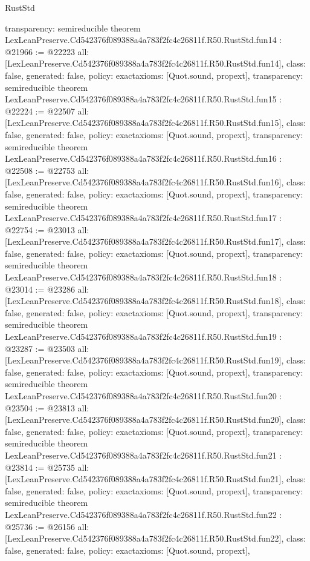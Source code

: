 \begin{lexlean}{RustStd}
\begin{coremodule}
{  transparency: semireducible
}
theorem LexLeanPreserve.Cd542376f089388a4a783f2fc4c26811f.R50.RustStd.fun14 : @21966 := @22223 {
  all: [LexLeanPreserve.Cd542376f089388a4a783f2fc4c26811f.R50.RustStd.fun14],
  class: false,
  generated: false,
  policy: exact{axioms: [Quot.sound, propext]},
  transparency: semireducible
}
theorem LexLeanPreserve.Cd542376f089388a4a783f2fc4c26811f.R50.RustStd.fun15 : @22224 := @22507 {
  all: [LexLeanPreserve.Cd542376f089388a4a783f2fc4c26811f.R50.RustStd.fun15],
  class: false,
  generated: false,
  policy: exact{axioms: [Quot.sound, propext]},
  transparency: semireducible
}
theorem LexLeanPreserve.Cd542376f089388a4a783f2fc4c26811f.R50.RustStd.fun16 : @22508 := @22753 {
  all: [LexLeanPreserve.Cd542376f089388a4a783f2fc4c26811f.R50.RustStd.fun16],
  class: false,
  generated: false,
  policy: exact{axioms: [Quot.sound, propext]},
  transparency: semireducible
}
theorem LexLeanPreserve.Cd542376f089388a4a783f2fc4c26811f.R50.RustStd.fun17 : @22754 := @23013 {
  all: [LexLeanPreserve.Cd542376f089388a4a783f2fc4c26811f.R50.RustStd.fun17],
  class: false,
  generated: false,
  policy: exact{axioms: [Quot.sound, propext]},
  transparency: semireducible
}
theorem LexLeanPreserve.Cd542376f089388a4a783f2fc4c26811f.R50.RustStd.fun18 : @23014 := @23286 {
  all: [LexLeanPreserve.Cd542376f089388a4a783f2fc4c26811f.R50.RustStd.fun18],
  class: false,
  generated: false,
  policy: exact{axioms: [Quot.sound, propext]},
  transparency: semireducible
}
theorem LexLeanPreserve.Cd542376f089388a4a783f2fc4c26811f.R50.RustStd.fun19 : @23287 := @23503 {
  all: [LexLeanPreserve.Cd542376f089388a4a783f2fc4c26811f.R50.RustStd.fun19],
  class: false,
  generated: false,
  policy: exact{axioms: [Quot.sound, propext]},
  transparency: semireducible
}
theorem LexLeanPreserve.Cd542376f089388a4a783f2fc4c26811f.R50.RustStd.fun20 : @23504 := @23813 {
  all: [LexLeanPreserve.Cd542376f089388a4a783f2fc4c26811f.R50.RustStd.fun20],
  class: false,
  generated: false,
  policy: exact{axioms: [Quot.sound, propext]},
  transparency: semireducible
}
theorem LexLeanPreserve.Cd542376f089388a4a783f2fc4c26811f.R50.RustStd.fun21 : @23814 := @25735 {
  all: [LexLeanPreserve.Cd542376f089388a4a783f2fc4c26811f.R50.RustStd.fun21],
  class: false,
  generated: false,
  policy: exact{axioms: [Quot.sound, propext]},
  transparency: semireducible
}
theorem LexLeanPreserve.Cd542376f089388a4a783f2fc4c26811f.R50.RustStd.fun22 : @25736 := @26156 {
  all: [LexLeanPreserve.Cd542376f089388a4a783f2fc4c26811f.R50.RustStd.fun22],
  class: false,
  generated: false,
  policy: exact{axioms: [Quot.sound, propext]},
}
\end{coremodule}
\end{lexlean}
